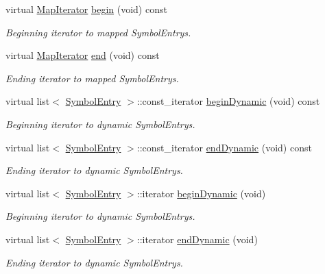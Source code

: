 \begin{DoxyCompactItemize}
virtual \mbox{\hyperlink{class_map_iterator}{Map\+Iterator}} \mbox{\hyperlink{class_scope_ghidra_ad17a63dadd4390989eaf9f20b8cbf173}{begin}} (void) const
\begin{DoxyCompactList}\small\item\em Beginning iterator to mapped Symbol\+Entrys. \end{DoxyCompactList}\item 
virtual \mbox{\hyperlink{class_map_iterator}{Map\+Iterator}} \mbox{\hyperlink{class_scope_ghidra_a7cf4b95214a2232a84e36ea5bfdd368c}{end}} (void) const
\begin{DoxyCompactList}\small\item\em Ending iterator to mapped Symbol\+Entrys. \end{DoxyCompactList}\item 
virtual list$<$ \mbox{\hyperlink{class_symbol_entry}{Symbol\+Entry}} $>$\+::const\+\_\+iterator \mbox{\hyperlink{class_scope_ghidra_a4f5b42e5c99ea0581c4819b550c2fc27}{begin\+Dynamic}} (void) const
\begin{DoxyCompactList}\small\item\em Beginning iterator to dynamic Symbol\+Entrys. \end{DoxyCompactList}\item 
virtual list$<$ \mbox{\hyperlink{class_symbol_entry}{Symbol\+Entry}} $>$\+::const\+\_\+iterator \mbox{\hyperlink{class_scope_ghidra_abbb53b6abc143a87ab2ad12337d9d571}{end\+Dynamic}} (void) const
\begin{DoxyCompactList}\small\item\em Ending iterator to dynamic Symbol\+Entrys. \end{DoxyCompactList}\item 
virtual list$<$ \mbox{\hyperlink{class_symbol_entry}{Symbol\+Entry}} $>$\+::iterator \mbox{\hyperlink{class_scope_ghidra_a9c510456a060e6bbfb503f7e861afd2e}{begin\+Dynamic}} (void)
\begin{DoxyCompactList}\small\item\em Beginning iterator to dynamic Symbol\+Entrys. \end{DoxyCompactList}\item 
virtual list$<$ \mbox{\hyperlink{class_symbol_entry}{Symbol\+Entry}} $>$\+::iterator \mbox{\hyperlink{class_scope_ghidra_abeb947fec06dcffbf611e30686a37657}{end\+Dynamic}} (void)
\begin{DoxyCompactList}\small\item\em Ending iterator to dynamic Symbol\+Entrys. \end{DoxyCompactList}\item 

\end{DoxyCompactItemize}
